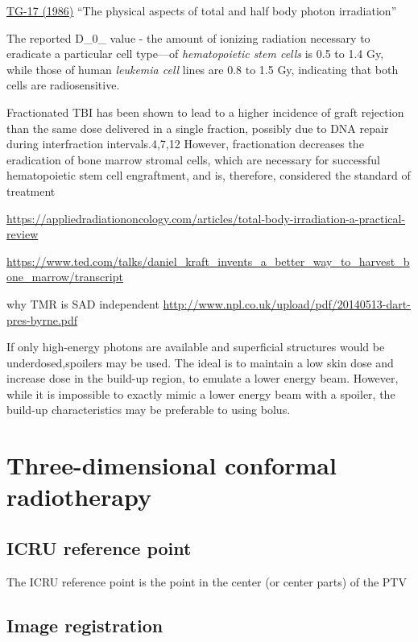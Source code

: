 \documentclass[]{book}
\theoremstyle{definition}
\theoremstyle{definition}
\theoremstyle{definition}
\theoremstyle{remark}
\begin{document}
\href{https://aapm.org/pubs/reports/RPT_17.pdf}{TG-17 (1986)} ``The
physical aspects of total and half body photon irradiation''

The reported D\_0\_ value - the amount of ionizing radiation necessary
to eradicate a particular cell type---of \emph{hematopoietic stem cells}
is 0.5 to 1.4 Gy, while those of human \emph{leukemia cell} lines are
0.8 to 1.5 Gy, indicating that both cells are radiosensitive.

Fractionated TBI has been shown to lead to a higher incidence of graft
rejection than the same dose delivered in a single fraction, possibly
due to DNA repair during interfraction intervals.4,7,12 However,
fractionation decreases the eradication of bone marrow stromal cells,
which are necessary for successful hematopoietic stem cell engraftment,
and is, therefore, considered the standard of treatment

\url{https://appliedradiationoncology.com/articles/total-body-irradiation-a-practical-review}

\url{https://www.ted.com/talks/daniel_kraft_invents_a_better_way_to_harvest_bone_marrow/transcript}

why TMR is SAD independent
\url{http://www.npl.co.uk/upload/pdf/20140513-dart-pres-byrne.pdf}

If only high-energy photons are available and superficial structures
would be underdosed,spoilers may be used. The ideal is to maintain a low
skin dose and increase dose in the build-up region, to emulate a lower
energy beam. However, while it is impossible to exactly mimic a lower
energy beam with a spoiler, the build-up characteristics may be
preferable to using bolus.

\chapter{Three-dimensional conformal radiotherapy}\label{crt}

\section{ICRU reference point}\label{icru-reference-point}

The ICRU reference point is the point in the center (or center parts) of
the PTV

\section{Image registration}\label{image-registration}
\end{document}
